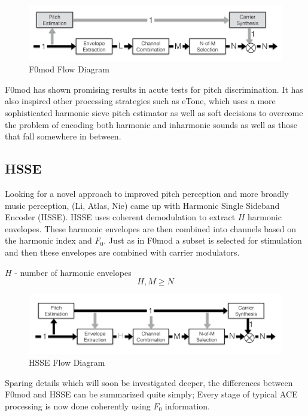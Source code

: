 \documentclass [11pt, proquest] {uwthesis}[2015/03/03]
\begin{document}
\begin{figure}[!ht]
  \centering
    \includegraphics[width=1\textwidth]{F0mod_flow_diagramTEMP}   
    \caption{F0mod Flow Diagram}
\end{figure}

F0mod has shown promising results in acute tests for pitch discrimination.  It has also inspired other processing strategies such as eTone, which uses a more sophisticated harmonic sieve pitch estimator as well as soft decisions to overcome the problem of encoding both harmonic and inharmonic sounds as well as those that fall somewhere in between.

\subsection{HSSE}

Looking for a novel approach to improved pitch perception and more broadly music perception, (Li, Atlas, Nie) came up with Harmonic Single Sideband Encoder (HSSE).  HSSE uses coherent demodulation to extract $H$ harmonic envelopes.  These harmonic envelopes are then combined into channels based on the harmonic index and $F_0$.  Just as in F0mod a subset is selected for stimulation and then these envelopes are combined with carrier modulators.

$H$ - number of harmonic envelopes
$$H, M \geq N$$

\begin{figure}[!ht]
  \centering
    \includegraphics[width=1\textwidth]{HSSE_flow_diagramTEMP}   
    \caption{HSSE Flow Diagram}
\end{figure}

Sparing details which will soon be investigated deeper, the differences between F0mod and HSSE can be summarized quite simply;  Every stage of typical ACE processing is now done coherently using $F_0$ information.
\end{document}
